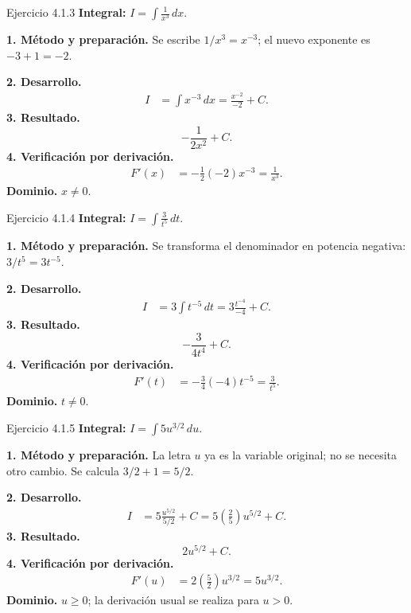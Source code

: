 \begin{examplebox}{Ejercicio 4.1.3}
\textbf{Integral:} $\displaystyle I=\int \frac1{x^3}\,dx$.

\textbf{1. Método y preparación.} Se escribe $1/x^3=x^{-3}$; el nuevo exponente es $-3+1=-2$.

\textbf{2. Desarrollo.}
\begin{align*}
I&=\int x^{-3}\,dx=\frac{x^{-2}}{-2}+C.
\end{align*}
\textbf{3. Resultado.}
\[
-\frac1{2x^2}+C.
\]
\textbf{4. Verificación por derivación.}
\begin{align*}
F'(x)&=-\frac12(-2)x^{-3}=\frac1{x^3}.
\end{align*}
\textbf{Dominio.} $x\ne0$.
\end{examplebox}

\begin{examplebox}{Ejercicio 4.1.4}
\textbf{Integral:} $\displaystyle I=\int \frac3{t^5}\,dt$.

\textbf{1. Método y preparación.} Se transforma el denominador en potencia negativa: $3/t^5=3t^{-5}$.

\textbf{2. Desarrollo.}
\begin{align*}
I&=3\int t^{-5}\,dt=3\frac{t^{-4}}{-4}+C.
\end{align*}
\textbf{3. Resultado.}
\[
-\frac3{4t^4}+C.
\]
\textbf{4. Verificación por derivación.}
\begin{align*}
F'(t)&=-\frac34(-4)t^{-5}=\frac3{t^5}.
\end{align*}
\textbf{Dominio.} $t\ne0$.
\end{examplebox}

\begin{examplebox}{Ejercicio 4.1.5}
\textbf{Integral:} $\displaystyle I=\int 5u^{3/2}\,du$.

\textbf{1. Método y preparación.} La letra $u$ ya es la variable original; no se necesita otro cambio. Se calcula $3/2+1=5/2$.

\textbf{2. Desarrollo.}
\begin{align*}
I&=5\frac{u^{5/2}}{5/2}+C=5\left(\frac25\right)u^{5/2}+C.
\end{align*}
\textbf{3. Resultado.}
\[
2u^{5/2}+C.
\]
\textbf{4. Verificación por derivación.}
\begin{align*}
F'(u)&=2\left(\frac52\right)u^{3/2}=5u^{3/2}.
\end{align*}
\textbf{Dominio.} $u\ge0$; la derivación usual se realiza para $u>0$.
\end{examplebox}

